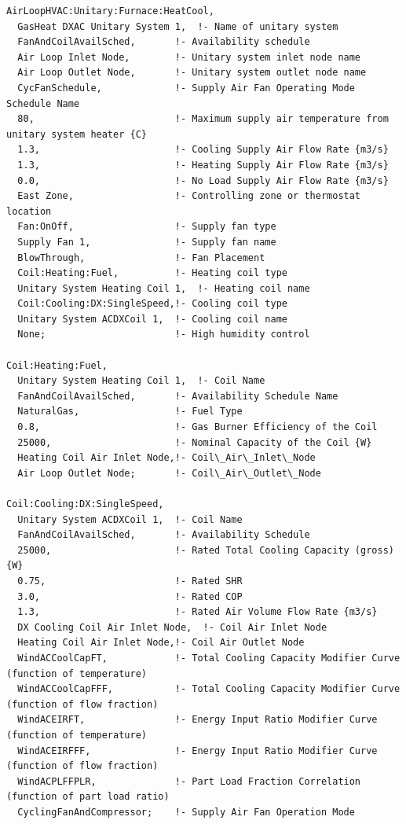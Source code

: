 \begin{lstlisting}
AirLoopHVAC:Unitary:Furnace:HeatCool,
  GasHeat DXAC Unitary System 1,  !- Name of unitary system
  FanAndCoilAvailSched,       !- Availability schedule
  Air Loop Inlet Node,        !- Unitary system inlet node name
  Air Loop Outlet Node,       !- Unitary system outlet node name
  CycFanSchedule,             !- Supply Air Fan Operating Mode Schedule Name
  80,                         !- Maximum supply air temperature from unitary system heater {C}
  1.3,                        !- Cooling Supply Air Flow Rate {m3/s}
  1.3,                        !- Heating Supply Air Flow Rate {m3/s}
  0.0,                        !- No Load Supply Air Flow Rate {m3/s}
  East Zone,                  !- Controlling zone or thermostat location
  Fan:OnOff,                  !- Supply fan type
  Supply Fan 1,               !- Supply fan name
  BlowThrough,                !- Fan Placement
  Coil:Heating:Fuel,          !- Heating coil type
  Unitary System Heating Coil 1,  !- Heating coil name
  Coil:Cooling:DX:SingleSpeed,!- Cooling coil type
  Unitary System ACDXCoil 1,  !- Cooling coil name
  None;                       !- High humidity control

Coil:Heating:Fuel,
  Unitary System Heating Coil 1,  !- Coil Name
  FanAndCoilAvailSched,       !- Availability Schedule Name
  NaturalGas,                 !- Fuel Type
  0.8,                        !- Gas Burner Efficiency of the Coil
  25000,                      !- Nominal Capacity of the Coil {W}
  Heating Coil Air Inlet Node,!- Coil\_Air\_Inlet\_Node
  Air Loop Outlet Node;       !- Coil\_Air\_Outlet\_Node

Coil:Cooling:DX:SingleSpeed,
  Unitary System ACDXCoil 1,  !- Coil Name
  FanAndCoilAvailSched,       !- Availability Schedule
  25000,                      !- Rated Total Cooling Capacity (gross) {W}
  0.75,                       !- Rated SHR
  3.0,                        !- Rated COP
  1.3,                        !- Rated Air Volume Flow Rate {m3/s}
  DX Cooling Coil Air Inlet Node,  !- Coil Air Inlet Node
  Heating Coil Air Inlet Node,!- Coil Air Outlet Node
  WindACCoolCapFT,            !- Total Cooling Capacity Modifier Curve (function of temperature)
  WindACCoolCapFFF,           !- Total Cooling Capacity Modifier Curve (function of flow fraction)
  WindACEIRFT,                !- Energy Input Ratio Modifier Curve (function of temperature)
  WindACEIRFFF,               !- Energy Input Ratio Modifier Curve (function of flow fraction)
  WindACPLFFPLR,              !- Part Load Fraction Correlation (function of part load ratio)
  CyclingFanAndCompressor;    !- Supply Air Fan Operation Mode


\end{lstlisting}
